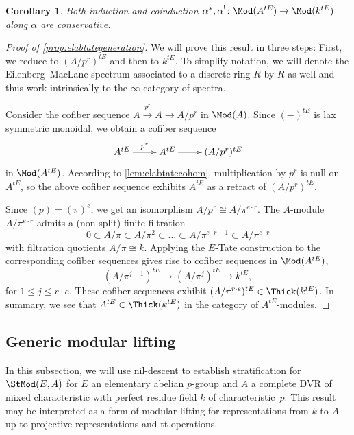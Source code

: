 \documentclass{amsart}%
\numberwithin{equation}{section}%
\newtheorem{Cor}[equation]{Corollary}
\theoremstyle{remark}
\begin{document}
\begin{Cor}\label{cor:elabtateconservative}
Both induction and coinduction $\alpha^*,\alpha^!\colon \Mod(A^{tE})\to\Mod(k^{tE})$ along $\alpha$ are conservative.
\end{Cor}

\begin{proof}[Proof of \cref{prop:elabtategeneration}]
We will prove this result in three steps: First, we reduce to $(A/p^r)^{tE}$ and then to $k^{tE}$. To simplify notation, we will denote the Eilenberg--MacLane spectrum associated to a discrete ring $R$ by $R$ as well and thus work intrinsically to the $\infty$-category of spectra.

Consider the cofiber sequence $A \xrightarrow{p^r} A \to A/p^r$ in $\Mod(A)$. Since $(-)^{tE}$ is lax symmetric monoidal, we obtain a cofiber sequence
\[
\xymatrix{A^{tE} \ar[r]^-{p^r} & A^{tE} \ar[r] & (A/p^r)^{tE}}
\]
in $\Mod(A^{tE})$. According to \cref{lem:elabtatecohom}, multiplication by $p^r$ is null on $A^{tE}$, so the above cofiber sequence exhibits $A^{tE}$ as a retract of $(A/p^r)^{tE}$.

Since $(p) = (\pi)^e$, we get an isomorphism $A/p^r \cong A/\pi^{e \cdot r}$. The $A$-module $A/\pi^{e\cdot r}$ admits a (non-split) finite filtration
\begin{equation}\label{eq:finitefiltration}
0 \subset A/\pi \subset A/\pi^2 \subset \ldots \subset A/\pi^{e\cdot r-1} \subset A/\pi^{e\cdot r}
\end{equation}
with filtration quotients $A/\pi\cong k$. Applying the $E$-Tate construction to the corresponding cofiber sequences gives rise to cofiber sequences in $\Mod(A^{tE})$,
\[
(A/\pi^{j-1})^{tE} \to (A/\pi^{j})^{tE} \to k^{tE},
\]
for $1\le j \le r\cdot e$. These cofiber sequences exhibit $(A/\pi^{r\cdot e})^{tE} \in \Thick(k^{tE})$. In summary, we see that $A^{tE} \in \Thick(k^{tE})$ in the category of $A^{tE}$-modules.
\end{proof}


\subsection{Generic modular lifting}

In this subsection, we will use nil-descent to establish stratification for $\StMod(E,A)$ for $E$ an elementary abelian $p$-group and $A$ a complete DVR of mixed characteristic with perfect residue field $k$ of characteristic~$p$. This result may be interpreted as a form of modular lifting for representations from $k$ to $A$ up to projective representations and tt-operations. 
\end{document}
